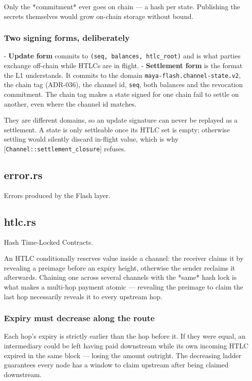 \documentclass[11pt,a4paper]{article}
\begin{document}
Only the *commitment* ever goes on chain — a hash per state. Publishing the
secrets themselves would grow on-chain storage without bound.

\subsubsection{Two signing forms, deliberately}

- \textbf{Update form} commits to \texttt{(seq, balances, htlc\_root)} and is what parties
  exchange off-chain while HTLCs are in flight.
- \textbf{Settlement form} is the format the L1 understands. It commits to the
  domain \texttt{maya-flash.channel-state.v2}, the chain tag (ADR-036), the channel
  id, \texttt{seq}, both balances and the revocation commitment. The chain tag
  makes a state signed for one chain fail to settle on another, even where the
  channel id matches.

They are different domains, so an update signature can never be replayed as a
settlement. A state is only settleable once its HTLC set is empty; otherwise
settling would silently discard in-flight value, which is why
[\texttt{Channel::settlement\_closure}] refuses.

\subsection{error.rs}
Errors produced by the Flash layer.

\subsection{htlc.rs}
Hash Time-Locked Contracts.

An HTLC conditionally reserves value inside a channel: the receiver claims it
by revealing a preimage before an expiry height, otherwise the sender
reclaims it afterwards. Chaining one across several channels with the *same*
hash lock is what makes a multi-hop payment atomic — revealing the preimage
to claim the last hop necessarily reveals it to every upstream hop.

\subsubsection{Expiry must decrease along the route}

Each hop's expiry is strictly earlier than the hop before it. If they were
equal, an intermediary could be left having paid downstream while its own
incoming HTLC expired in the same block — losing the amount outright. The
decreasing ladder guarantees every node has a window to claim upstream after
being claimed downstream.
\end{document}
